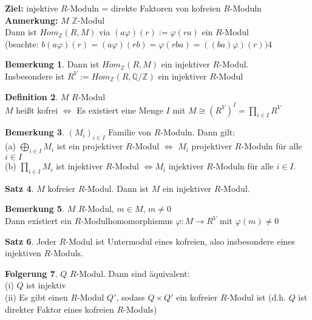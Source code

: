 \documentclass[10pt,a4paper,numbers=endperiod]{scrreprt}
\theoremstyle{definition}
\newtheorem{satz}{Satz}[section]
\newtheorem{defi}[satz]{Definition}
\newtheorem{bem}[satz]{Bemerkung}
\newtheorem{folg}[satz]{Folgerung}
\def\QQ{{\mathbb Q}}
\def\ZZ{{\mathbb Z}}
\begin{document}
\textbf{Ziel:} injektive $R$-Moduln = direkte Faktoren von kofreien $R$-Moduln\\

\textbf{Anmerkung:} $M$ $\ZZ$-Modul\\
Dann ist $Hom_\ZZ(R, M)$ via $(a\varphi)(r) := \varphi(ra)$ ein $R$-Modul\\
(beachte: $b(a\varphi)(r) = (a\varphi)(rb) = \varphi(rba) = ((ba) \varphi)(r))4$\\

\begin{bem}
	Dann ist $Hom_\ZZ(R,M)$ ein injektiver $R$-Modul.\\
	Insbesondere ist $R^V := Hom_\ZZ(R, \QQ/\ZZ)$ ein injektiver $R$-Modul
\end{bem}

\begin{defi}
	$M$ $R$-Modul\\
	$M$ heißt kofrei $\Leftrightarrow$ Es existiert eine Menge $I$ mit $M \cong (R^V)^I = \prod\limits_{i \in I} R^V$
\end{defi}

\begin{bem}
	$(M_i)_{i \in I}$ Familie von $R$-Moduln. Dann gilt:\\
	(a) $\bigoplus\limits_{i \in I} M_i$ ist ein projektiver $R$-Modul $\Leftrightarrow$ $M_i$ projektiver $R$-Moduln für alle $i \in I$\\
	(b) $\prod\limits_{i \in I} M_i$ ist injektiver $R$-Modul $\Leftrightarrow M_i$ injektiver $R$-Moduln für alle $i \in I$.
\end{bem}

\begin{satz}
	$M$ kofreier $R$-Modul. Dann ist $M$ ein injektiver $R$-Modul.
\end{satz}

\begin{bem}
	$M$ $R$-Modul, $m \in M$, $m \neq 0$\\
	Dann existiert ein $R$-Modulhomomorphismus $\varphi: M \to R^V$ mit $\varphi(m) \neq 0$
\end{bem}

\begin{satz}
	Jeder $R$-Modul ist Untermodul eines kofreien, also insbesondere eines injektiven $R$-Moduls.
\end{satz}

\begin{folg}
	$Q$ $R$-Modul. Dann sind äquivalent:\\
	(i) $Q$ ist injektiv\\
	(ii) Es gibt einen $R$-Modul $Q'$, sodass  $Q \times Q'$ ein kofreier $R$-Modul ist (d.h. $Q$ ist direkter Faktor eines kofreien $R$-Moduls)
\end{folg}
\end{document}
